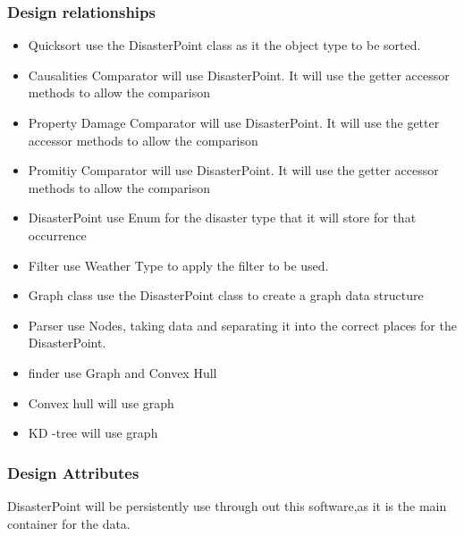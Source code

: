 \documentclass[12pt]{article}
\begin{document}
            \subsubsection{Design relationships}
                \begin{itemize}
                    \item Quicksort use the DisasterPoint class as it the object type to be sorted.
                    \item Causalities Comparator will use DisasterPoint. It will use the getter accessor methods to allow the comparison 
                    \item Property Damage Comparator will use DisasterPoint. It will use the getter accessor methods to allow the comparison
                    \item Promitiy Comparator will use DisasterPoint. It will use the getter accessor methods to allow the comparison 
                    \item DisasterPoint use Enum for the disaster type that it will store for that occurrence 
                    \item Filter use Weather Type to apply the filter to be used.
                    \item Graph class use the DisasterPoint class to create a graph data structure 
                    \item Parser use Nodes, taking data and separating it into the correct places for the DisasterPoint.
                    \item finder use Graph and Convex Hull
                    
                    \item Convex hull will use graph 
                    \item KD -tree will use graph 
                \end{itemize}
                
            \subsubsection{Design Attributes}
                DisasterPoint will be persistently use through out this software,as it is the main container for the data.
                
\end{document}
